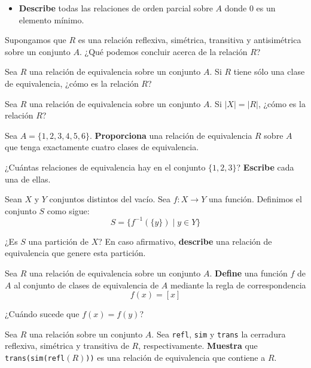 \documentclass[oneside]{style}
\begin{document}
\begin{questions}[label=\protect\circled{\bfseries\arabic*}]
{\begin{itemize}
            \item \textbf{Describe} todas las relaciones de orden parcial sobre 
            $A$ donde $0$ es un elemento mínimo. 
        \end{itemize}
    }

    \question
    {
        Supongamos que $R$ es una relación reflexiva, simétrica, transitiva y 
        antisimétrica sobre un conjunto $A$. ¿Qué podemos concluir acerca de la 
        relación $R$?
    }

    \question
    {
        Sea $R$ una relación de equivalencia sobre un conjunto $A$. Si $R$ tiene 
        sólo una clase de equivalencia, ¿cómo es la relación $R$?
    }

    \question
    {
        Sea $R$ una relación de equivalencia sobre un conjunto $A$. Si 
        $|X| = |R|$, ¿cómo es la relación $R$?
    }

    \question
    {
        Sea $A = \{1,2,3,4,5,6\}$. \textbf{Proporciona} una relación de 
        equivalencia $R$ sobre $A$ que tenga exactamente cuatro clases de 
        equivalencia. 
    }

    \question
    {
        ¿Cuántas relaciones de equivalencia hay en el conjunto 
        $\{1,2,3\}$? \textbf{Escribe} cada una de ellas.  
    }

    \question
    {
        Sean $X$ y $Y$ conjuntos distintos del vacío. Sea $f: X 
        \rightarrow Y$ una función. Definimos el conjunto $S$ como sigue:
        \begin{equation*}
            S = \{f^{-1}(\{y\}) \; | \; y \in Y\}
        \end{equation*}

        ¿Es $S$ una partición de $X$? En caso afirmativo, \textbf{describe} 
        una relación de equivalencia que genere esta partición.
    }

    \question
    {
        Sea $R$ una relación de equivalencia sobre un conjunto $A$. 
        \textbf{Define} una función $f$ de $A$ al conjunto de clases de 
        equivalencia de $A$ mediante la regla de correspondencia 
        \begin{equation*}
            f(x) = [x]
        \end{equation*}

        ¿Cuándo sucede que $f(x) = f(y)$?
    }

    \question
    {
        Sea $R$ una relación sobre un conjunto $A$. Sea \texttt{refl}, 
        \texttt{sim} y \texttt{trans} la cerradura reflexiva, simétrica y 
        transitiva de $R$, respectivamente. \textbf{Muestra} que 
        \texttt{trans(\texttt{sim(\texttt{refl$(R)$})})} es una relación de 
        equivalencia que contiene a $R$. 
    }


\end{questions}
\end{document}

